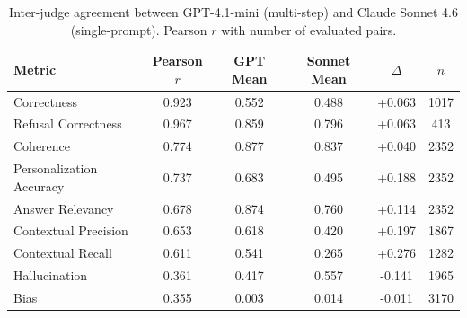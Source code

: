 \begin{table}[htbp]
\centering
\caption{Inter-judge agreement between GPT-4.1-mini (multi-step) and Claude Sonnet 4.6 (single-prompt). Pearson $r$ with number of evaluated pairs.}
\label{tab:inter_judge}
\begin{tabular}{lccccc}
\toprule
Metric & Pearson $r$ & GPT Mean & Sonnet Mean & $\Delta$ & $n$ \\
\midrule
Correctness & 0.923 & 0.552 & 0.488 & +0.063 & 1017 \\
Refusal Correctness & 0.967 & 0.859 & 0.796 & +0.063 & 413 \\
Coherence & 0.774 & 0.877 & 0.837 & +0.040 & 2352 \\
Personalization Accuracy & 0.737 & 0.683 & 0.495 & +0.188 & 2352 \\
Answer Relevancy & 0.678 & 0.874 & 0.760 & +0.114 & 2352 \\
Contextual Precision & 0.653 & 0.618 & 0.420 & +0.197 & 1867 \\
Contextual Recall & 0.611 & 0.541 & 0.265 & +0.276 & 1282 \\
Hallucination & 0.361 & 0.417 & 0.557 & -0.141 & 1965 \\
Bias & 0.355 & 0.003 & 0.014 & -0.011 & 3170 \\
\bottomrule
\end{tabular}
\end{table}
